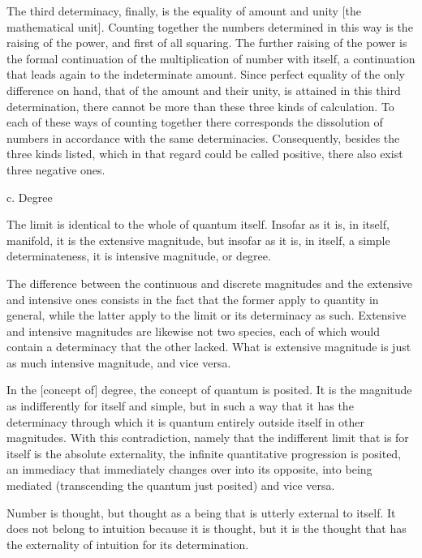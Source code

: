     The third determinacy, finally, is
    the equality of amount and unity [the mathematical unit].
    Counting together the numbers
    determined in this way is the raising of the power,
    and first of all squaring.
    The further raising of the power is the formal
    continuation of the multiplication of number with itself,
    a continuation that leads again to the indeterminate amount.
    Since perfect equality of the only difference on hand,
    that of the amount and their unity, is attained in this third
    determination, there cannot be more than these three kinds of
    calculation.
    To each of these ways of counting together there corresponds
    the dissolution of numbers in accordance with the same determinacies.
    Consequently, besides the three kinds listed,
    which in that regard could be called positive,
    there also exist three negative ones.

c. Degree

The limit is identical to the whole of quantum itself.
Insofar as it is, in itself, manifold, it is the extensive magnitude,
but insofar as it is, in itself, a simple determinateness,
it is intensive magnitude, or degree.

    The difference between the continuous and discrete magnitudes and
    the extensive and intensive ones consists in the fact that the former
    apply to quantity in general, while the latter apply to the limit or
    its determinacy as such.
    Extensive and intensive magnitudes are likewise not two species,
    each of which would contain a determinacy that the other lacked.
    What is extensive magnitude is just as much intensive magnitude, and vice versa.

In the [concept of] degree, the concept of quantum is posited.
It is the magnitude as indifferently for itself and simple,
but in such a way that it has the determinacy through which
it is quantum entirely outside itself in other magnitudes.
With this contradiction, namely that the indifferent limit
that is for itself is the absolute externality,
the infinite quantitative progression is posited,
an immediacy that immediately changes over into its opposite,
into being mediated (transcending the quantum just posited)
and vice versa.

    Number is thought, but thought as
    a being that is utterly external to itself.
    It does not belong to intuition because it is thought,
    but it is the thought that has the externality of intuition
    for its determination.

